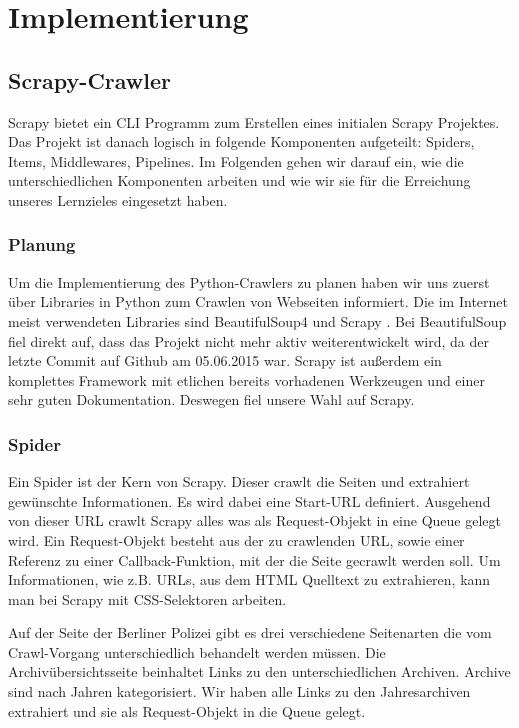 \chapter{Implementierung}

\section{Scrapy-Crawler}

Scrapy bietet ein CLI Programm zum Erstellen eines initialen Scrapy Projektes.
Das Projekt ist danach logisch in folgende Komponenten aufgeteilt: Spiders, Items, Middlewares, Pipelines.
Im Folgenden gehen wir darauf ein, wie die unterschiedlichen Komponenten arbeiten und wie wir sie für die
Erreichung unseres Lernzieles eingesetzt haben.

\subsection{Planung}

Um die Implementierung des Python-Crawlers zu planen haben wir uns zuerst
über Libraries in Python zum Crawlen von Webseiten informiert. Die im
Internet meist verwendeten Libraries sind BeautifulSoup4\cite{beausoup}
und Scrapy\cite{scrapy} . Bei BeautifulSoup fiel direkt auf, dass das Projekt
nicht mehr aktiv weiterentwickelt wird, da der letzte Commit auf Github am
05.06.2015 war. Scrapy ist außerdem ein komplettes Framework mit etlichen
bereits vorhadenen Werkzeugen und einer sehr guten Dokumentation. Deswegen
fiel unsere Wahl auf Scrapy.

\subsection{Spider}

Ein Spider ist der Kern von Scrapy. Dieser crawlt die Seiten und extrahiert gewünschte Informationen.
Es wird dabei eine Start-URL definiert. Ausgehend von dieser URL crawlt Scrapy alles was als Request-Objekt in
eine Queue gelegt wird. Ein Request-Objekt besteht aus der zu crawlenden URL, sowie einer Referenz zu einer Callback-Funktion,
mit der die Seite gecrawlt werden soll. Um Informationen, wie z.B. URLs, aus dem HTML Quelltext zu extrahieren, kann man bei Scrapy
mit CSS-Selektoren arbeiten.

Auf der Seite der Berliner Polizei gibt es drei verschiedene Seitenarten die vom Crawl-Vorgang
unterschiedlich behandelt werden müssen. Die Archivübersichtsseite beinhaltet Links zu den unterschiedlichen Archiven.
Archive sind nach Jahren kategorisiert. Wir haben alle Links zu den Jahresarchiven extrahiert und sie als Request-Objekt in die Queue gelegt.

